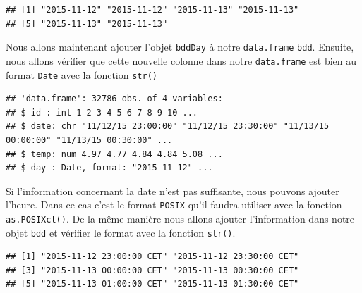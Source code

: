 \documentclass[twoside,symmetric]{book}
\newenvironment{Shaded}{}{}
\newcommand{\DataTypeTok}[1]{\underline{#1}}
\newcommand{\KeywordTok}[1]{\textbf{#1}}
\newcommand{\NormalTok}[1]{#1}
\newcommand{\OperatorTok}[1]{#1}
\newcommand{\StringTok}[1]{#1}
\begin{document}
\begin{verbatim}
## [1] "2015-11-12" "2015-11-12" "2015-11-13" "2015-11-13"
## [5] "2015-11-13" "2015-11-13"
\end{verbatim}

Nous allons maintenant ajouter l'objet \texttt{bddDay} à notre \texttt{data.frame} \texttt{bdd}. Ensuite, nous allons vérifier que cette nouvelle colonne dans notre \texttt{data.frame} est bien au format \texttt{Date} avec la fonction \texttt{str()}

\begin{Shaded}
\end{Shaded}

\begin{verbatim}
## 'data.frame': 32786 obs. of 4 variables:
## $ id : int 1 2 3 4 5 6 7 8 9 10 ...
## $ date: chr "11/12/15 23:00:00" "11/12/15 23:30:00" "11/13/15
00:00:00" "11/13/15 00:30:00" ...
## $ temp: num 4.97 4.77 4.84 4.84 5.08 ...
## $ day : Date, format: "2015-11-12" ...
\end{verbatim}

Si l'information concernant la date n'est pas suffisante, nous pouvons ajouter l'heure. Dans ce cas c'est le format \texttt{POSIX} qu'il faudra utiliser avec la fonction \texttt{as.POSIXct()}. De la même manière nous allons ajouter l'information dans notre objet \texttt{bdd} et vérifier le format avec la fonction \texttt{str()}.

\begin{Shaded}
\end{Shaded}

\begin{verbatim}
## [1] "2015-11-12 23:00:00 CET" "2015-11-12 23:30:00 CET"
## [3] "2015-11-13 00:00:00 CET" "2015-11-13 00:30:00 CET"
## [5] "2015-11-13 01:00:00 CET" "2015-11-13 01:30:00 CET"
\end{verbatim}

\begin{Shaded}
\end{Shaded}
\end{document}
